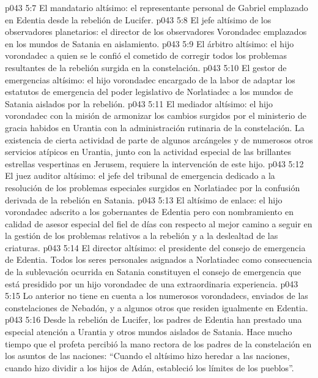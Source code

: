 \vs p043 5:7 El mandatario altísimo: el representante personal de Gabriel emplazado en Edentia desde la rebelión de Lucifer.
\vs p043 5:8 El jefe altísimo de los observadores planetarios: el director de los observadores Vorondadec emplazados en los mundos de Satania en aislamiento.
\vs p043 5:9 El árbitro altísimo: el hijo vorondadec a quien se le confió el cometido de corregir todos los problemas resultantes de la rebelión surgida en la constelación.
\vs p043 5:10 El gestor de emergencias altísimo: el hijo vorondadec encargado de la labor de adaptar los estatutos de emergencia del poder legislativo de Norlatiadec a los mundos de Satania aislados por la rebelión.
\vs p043 5:11 El mediador altísimo: el hijo vorondadec con la misión de armonizar los cambios surgidos por el ministerio de gracia habidos en Urantia con la administración rutinaria de la constelación. La existencia de cierta actividad de parte de algunos arcángeles y de numerosos otros servicios atípicos en Urantia, junto con la actividad especial de las brillantes estrellas vespertinas en Jerusem, requiere la intervención de este hijo.
\vs p043 5:12 El juez auditor altísimo: el jefe del tribunal de emergencia dedicado a la resolución de los problemas especiales surgidos en Norlatiadec por la confusión derivada de la rebelión en Satania.
\vs p043 5:13 El altísimo de enlace: el hijo vorondadec adscrito a los gobernantes de Edentia pero con nombramiento en calidad de asesor especial del fiel de días con respecto al mejor camino a seguir en la gestión de los problemas relativos a la rebelión y a la deslealtad de las criaturas.
\vs p043 5:14 El director altísimo: el presidente del consejo de emergencia de Edentia. Todos los seres personales asignados a Norlatiadec como consecuencia de la sublevación ocurrida en Satania constituyen el consejo de emergencia que está presidido por un hijo vorondadec de una extraordinaria experiencia.
\vs p043 5:15 Lo anterior no tiene en cuenta a los numerosos vorondadecs, enviados de las constelaciones de Nebadón, y a algunos otros que residen igualmente en Edentia.
\vs p043 5:16 \pc Desde la rebelión de Lucifer, los padres de Edentia han prestado una especial atención a Urantia y otros mundos aislados de Satania. Hace mucho tiempo que el profeta percibió la mano rectora de los padres de la constelación en los asuntos de las naciones: “Cuando el altísimo hizo heredar a las naciones, cuando hizo dividir a los hijos de Adán, estableció los límites de los pueblos”.
